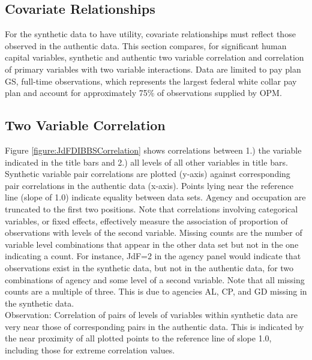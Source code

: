 \documentclass[10pt, letterpaper]{article}
\begin{document}
\begin{spacing}{1.0}
\clearpage

\section{Covariate Relationships}

For the synthetic data to have utility, covariate relationships must reflect those observed in the authentic data.  This section compares, for significant human capital variables, synthetic and authentic two variable correlation and correlation of primary variables with two variable interactions.  Data are limited to pay plan GS, full-time observations, which represents the largest federal white collar pay plan and account for approximately 75\% of observations supplied by OPM.

\subsection{Two Variable Correlation}

Figure \ref{figure:JdFDIBBSCorrelation} shows correlations between 1.) the variable indicated in the title bars and 2.) all levels of all other variables in title bars.  Synthetic variable pair correlations are plotted (y-axis) against corresponding pair correlations in the authentic data (x-axis).  Points lying near the reference line (slope of 1.0) indicate equality between data sets.  Agency and occupation are truncated to the first two positions.  Note that correlations involving categorical variables, or fixed effects, effectively measure the association of proportion of observations with levels of the second variable.  Missing counts are the number of variable level combinations that appear in the other data set but not in the one indicating a count.  For instance, JdF=2 in the agency panel would indicate that observations exist in the synthetic data, but not in the authentic data, for two combinations of agency and some level of a second variable.  Note that all missing counts are a multiple of three.  This is due to agencies AL, CP, and GD missing in the synthetic data.\\

Observation:  Correlation of pairs of levels of variables within synthetic data are very near those of  corresponding pairs in the authentic data. This is indicated by the near proximity of all plotted points to the reference line of slope 1.0, including those for extreme correlation values.  


\end{spacing}
\end{document}
